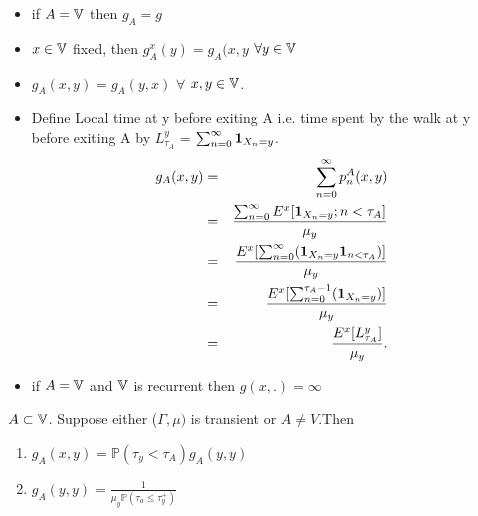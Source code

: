 \documentclass[main]{subfiles}
\begin{document}
\begin{notation}

     \begin{itemize}

          \item if $A=\mathbb{V}$ then $g_A=g$
          \item $x \in \mathbb{V}$ fixed, then $g_A^x(y)= g_A(x,y $ $\forall y \in \mathbb{V}$

     \end{itemize}

     \begin{obs}
          \begin{itemize}
               \item $g_A(x,y) = g_A(y,x)$ $\forall$ $x,y \in \mathbb{V}$.
               \item
                     Define Local time at y before exiting A i.e. time spent by the walk at y before exiting A by $L_{\tau_A}^y$ = $\sum_{n=0}^{\infty}  \mathbf{1}_{X_n=y}$.
                     \begin{eqnarray*}
                          g_A(x,y)&=& \sum_{n=0}^{\infty} p_n^A(x,y) \\
                          &=& \frac{\sum_{n=0}^{\infty} E^x[\mathbf{1}_{X_n=y}; n<\tau_A ]}{\mu_y} \\
                          &=&\frac{E^x[\sum_{n=0}^{\infty} (\mathbf{1}_{X_n=y} \mathbf{1}_{n<\tau_A}) ]}{\mu_y} \\
                          &=&\frac{E^x[\sum_{n=0}^{\tau_A-1} (\mathbf{1}_{X_n=y}) ]}{\mu_y} \\
                          &=&\frac{E^x[L_{\tau_A}^y]}{\mu_y}.
                     \end{eqnarray*}

               \item if $A=\mathbb{V}$ and $\mathbb{V}$ is recurrent then $g(x,.)=\infty$
          \end{itemize}
     \end{obs}
\end{notation}

\begin{theorem}
     $A\subset \mathbb{V}$. Suppose either ($\Gamma, \mu)$ is transient or $A \neq V$.Then
     \begin{enumerate}
          \item $g_A(x,y)= \mathbb{P} (\tau_y < \tau_A)g_A(y,y)$
          \item $g_A(y,y)=\frac{1}{\mu_y \mathbb{P}(\tau_a \leq \tau_y^+)}$
     \end{enumerate}
\end{theorem}
\end{document}
